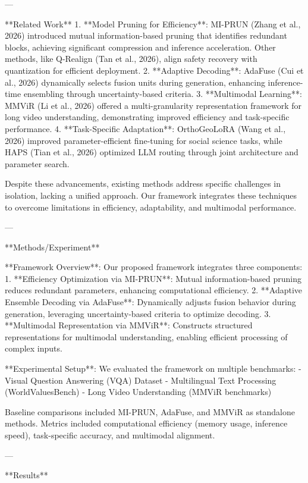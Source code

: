 ---

**Related Work**  
1. **Model Pruning for Efficiency**: MI-PRUN (Zhang et al., 2026) introduced mutual information-based pruning that identifies redundant blocks, achieving significant compression and inference acceleration. Other methods, like Q-Realign (Tan et al., 2026), align safety recovery with quantization for efficient deployment.  
2. **Adaptive Decoding**: AdaFuse (Cui et al., 2026) dynamically selects fusion units during generation, enhancing inference-time ensembling through uncertainty-based criteria.  
3. **Multimodal Learning**: MMViR (Li et al., 2026) offered a multi-granularity representation framework for long video understanding, demonstrating improved efficiency and task-specific performance.  
4. **Task-Specific Adaptation**: OrthoGeoLoRA (Wang et al., 2026) improved parameter-efficient fine-tuning for social science tasks, while HAPS (Tian et al., 2026) optimized LLM routing through joint architecture and parameter search.  

Despite these advancements, existing methods address specific challenges in isolation, lacking a unified approach. Our framework integrates these techniques to overcome limitations in efficiency, adaptability, and multimodal performance.  

---

**Methods/Experiment**  

**Framework Overview**:  
Our proposed framework integrates three components:  
1. **Efficiency Optimization via MI-PRUN**: Mutual information-based pruning reduces redundant parameters, enhancing computational efficiency.  
2. **Adaptive Ensemble Decoding via AdaFuse**: Dynamically adjusts fusion behavior during generation, leveraging uncertainty-based criteria to optimize decoding.  
3. **Multimodal Representation via MMViR**: Constructs structured representations for multimodal understanding, enabling efficient processing of complex inputs.  

**Experimental Setup**:  
We evaluated the framework on multiple benchmarks:  
- Visual Question Answering (VQA) Dataset  
- Multilingual Text Processing (WorldValuesBench)  
- Long Video Understanding (MMViR benchmarks)  

Baseline comparisons included MI-PRUN, AdaFuse, and MMViR as standalone methods. Metrics included computational efficiency (memory usage, inference speed), task-specific accuracy, and multimodal alignment.  

---

**Results**  

